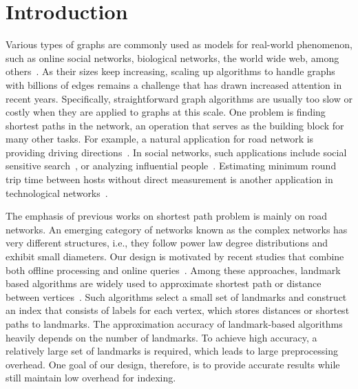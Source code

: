 \section{Introduction}
\label{introduction}

Various types of graphs are commonly used as models for real-world phenomenon, such as online social networks, biological networks, the world wide web, among others~\cite{newman2010networks}. As their sizes keep increasing, scaling up algorithms to handle graphs with billions of edges remains a challenge that has drawn increased attention in recent years. Specifically, straightforward graph algorithms are usually too slow or costly when they are applied to graphs at this scale. One problem is finding shortest paths in the network, an operation that serves as the building block for many other tasks. For example, a natural application for road network is providing driving directions~\cite{Abraham:2011:HLA:2008623.2008645}. In social networks, such applications include social sensitive search~\cite{Vieira:2007:ESR:1321440.1321520}, or analyzing influential people~\cite{Kempe:2003:MSI:956750.956769}. Estimating minimum round trip time between hosts without direct measurement is another application in technological networks~\cite{Tang:2003:VLI:948205.948223}. 

The emphasis of previous works on shortest path problem is mainly on road networks. An emerging category of networks known as the complex networks has very different structures, i.e., they follow power law degree distributions and exhibit small diameters. 
Our design is motivated by recent studies that combine both offline processing and online queries~\cite{Potamias:2009:FSP:1645953.1646063, tretyakov2011fast, Akiba:2012:SQC:2247596.2247614, 6399472, Jin:2012:HLA:2213836.2213887}. 
Among these approaches, landmark based algorithms are widely used to approximate shortest path or distance between vertices~\cite{Thorup:2005:ADO:1044731.1044732, Goldberg:2005:CSP:1070432.1070455, Potamias:2009:FSP:1645953.1646063, Gubichev:2010:FAE:1871437.1871503, tretyakov2011fast, 6399472}. Such algorithms select a small set of landmarks and construct an index that consists of labels for each vertex, which stores distances or shortest paths to landmarks. The approximation accuracy of landmark-based algorithms heavily depends on the number of landmarks. To achieve high accuracy, a relatively large set of landmarks is required, which leads to large preprocessing overhead. 
One goal of our design, therefore, is to provide accurate results while still maintain low overhead for indexing.

